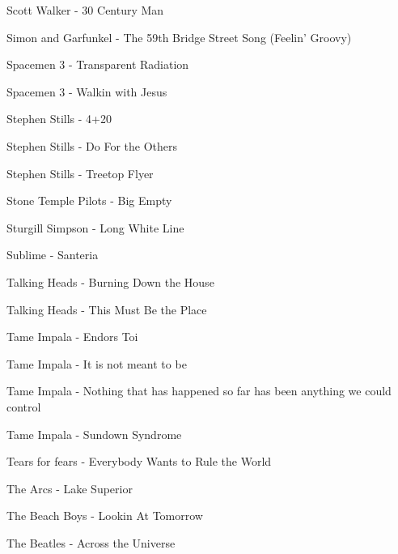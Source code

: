 Scott Walker - 30 Century Man \dotfill \pageref{30 Century Man - Scott Walker} 

Simon and Garfunkel - The 59th Bridge Street Song (Feelin' Groovy) \dotfill \pageref{The 59th Bridge Street Song (Feelin' Groovy) - Simon and Garfunkel} 

Spacemen 3 - Transparent Radiation \dotfill \pageref{Transparent Radiation - Spacemen 3} 

Spacemen 3 - Walkin with Jesus \dotfill \pageref{Walkin with Jesus - Spacemen 3} 

Stephen Stills - 4+20 \dotfill \pageref{4+20 - Stephen Stills} 

Stephen Stills - Do For the Others \dotfill \pageref{Do For the Others - Stephen Stills} 

Stephen Stills - Treetop Flyer \dotfill \pageref{Treetop Flyer - Stephen Stills} 

Stone Temple Pilots - Big Empty \dotfill \pageref{Big Empty - Stone Temple Pilots} 

Sturgill Simpson - Long White Line \dotfill \pageref{Long White Line - Sturgill Simpson} 

Sublime - Santeria \dotfill \pageref{Santeria - Sublime} 

Talking Heads - Burning Down the House \dotfill \pageref{Burning Down the House - Talking Heads} 

Talking Heads - This Must Be the Place \dotfill \pageref{This Must Be the Place - Talking Heads} 

Tame Impala - Endors Toi \dotfill \pageref{Endors Toi - Tame Impala} 

Tame Impala - It is not meant to be \dotfill \pageref{It is not meant to be - Tame Impala} 

Tame Impala - Nothing that has happened so far has been anything we could control \dotfill \pageref{Nothing that has happened so far has been anything we could control - Tame Impala} 

Tame Impala - Sundown Syndrome \dotfill \pageref{Sundown Syndrome - Tame Impala} 

Tears for fears - Everybody Wants to Rule the World \dotfill \pageref{Everybody Wants to Rule the World - Tears for fears} 

The Arcs - Lake Superior \dotfill \pageref{Lake Superior - The Arcs} 

The Beach Boys - Lookin At Tomorrow \dotfill \pageref{Lookin At Tomorrow - The Beach Boys} 

The Beatles - Across the Universe \dotfill \pageref{Across the Universe - The Beatles} 

